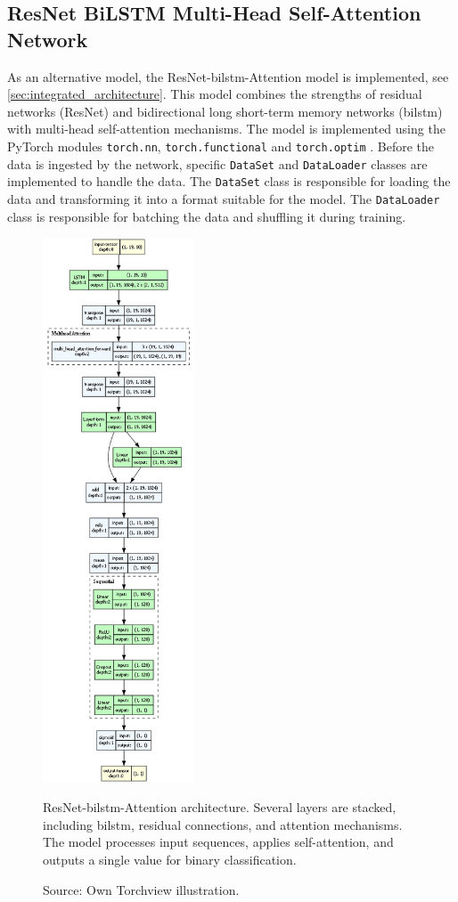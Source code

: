 \subsection{ResNet BiLSTM Multi-Head Self-Attention Network}
As an alternative model, the ResNet-\gls{bilstm}-Attention model is implemented, see \autoref{sec:integrated_architecture}. This model combines the strengths of residual networks (ResNet) and bidirectional long short-term memory networks (\gls{bilstm}) with multi-head self-attention mechanisms. The model is implemented using the PyTorch modules \texttt{torch.nn}, \texttt{torch.functional} and \texttt{torch.optim} \autocite{PyTorch}. Before the data is ingested by the network, specific \texttt{DataSet} and \texttt{DataLoader} classes are implemented to handle the data. The \texttt{DataSet} class is responsible for loading the data and transforming it into a format suitable for the model. The \texttt{DataLoader} class is responsible for batching the data and shuffling it during training.

\begin{figure}[htbp]
  \centering
  \includegraphics[width=0.4\textwidth]{figures/architecture.png}
  \caption[ResNet-BiLSTM-Attention Architecture]{ResNet-\gls{bilstm}-Attention architecture. Several layers are stacked, including \gls{bilstm}, residual connections, and attention mechanisms. The model processes input sequences, applies self-attention, and outputs a single value for binary classification.}
  \label{fig:architecture}
  \caption*{Source: Own Torchview illustration.}
\end{figure}


